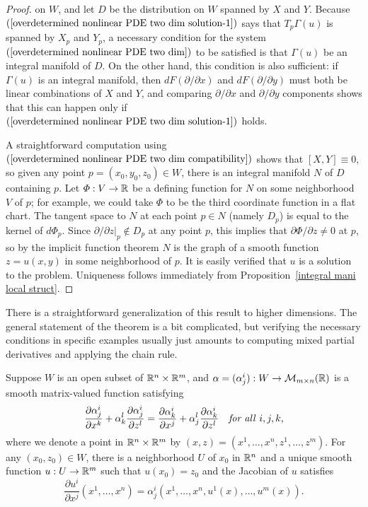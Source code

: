 \begin{proof}
on $W$, and let $D$ be the distribution on $W$ spanned by $X$ and $Y$. Because $(\ref{overdetermined nonlinear PDE two dim solution-1})$ says that $T_p\Gamma(u)$ is spanned by $X_p$ and $Y_p$, a necessary condition for the system $(\ref{overdetermined nonlinear PDE two dim})$ to be satisfied is that $\Gamma(u)$ be an integral manifold of $D$. On the other hand, this condition is also sufficient: if $\Gamma(u)$ is an integral manifold, then $dF(\partial/\partial x)$ and $dF(\partial/\partial y)$ must both be linear combinations of $X$ and $Y$, and comparing $\partial/\partial x$ and $\partial/\partial y$ components shows that this can happen only if $(\ref{overdetermined nonlinear PDE two dim solution-1})$ holds.\par
A straightforward computation using $(\ref{overdetermined nonlinear PDE two dim compatibility})$ shows that $[X,Y]\equiv 0$, so given any point $p=(x_0,y_0,z_0)\in W$, there is an integral manifold $N$ of $D$ containing $p$. Let $\varPhi:V\to\mathbb{R}$ be a defining function for $N$ on some neighborhood $V$ of $p$; for example, we could take $\varPhi$ to be the third coordinate function in a flat chart. The tangent space to $N$ at each point $p\in N$ (namely $D_p$) is equal to the kernel of $d\varPhi_p$. Since $\partial/\partial z|_p\notin D_p$ at any point $p$, this implies that $\partial\varPhi/\partial z\neq 0$ at $p$, so by the implicit function theorem $N$ is the graph of a smooth function $z=u(x,y)$ in some neighborhood of $p$. It is easily verified that $u$ is a solution to the problem. Uniqueness follows immediately from Proposition~\ref{integral mani local struct}.
\end{proof}
There is a straightforward generalization of this result to higher dimensions. The general statement of the theorem is a bit complicated, but verifying the necessary conditions in specific examples usually just amounts to computing mixed partial derivatives and applying the chain rule.
\begin{proposition}
Suppose $W$ is an open subset of $\mathbb{R}^n\times\mathbb{R}^m$, and $\alpha=(\alpha^i_j):W\to\mathcal{M}_{m\times n}(\mathbb{R})$ is a smooth matrix-valued function satisfying
\begin{align*}
\frac{\partial\alpha^i_j}{\partial x^k}+\alpha^l_k\frac{\partial\alpha^i_j}{\partial z^l}=\frac{\partial\alpha^i_k}{\partial x^j}+\alpha^l_j\frac{\partial\alpha^i_k}{\partial z^l}\quad\text{\textit{for all} }i,j,k,
\end{align*}
where we denote a point in $\mathbb{R}^n\times\mathbb{R}^m$ by $(x,z)=(x^1,\dots,x^n,z^1,\dots,z^m)$. For any $(x_0,z_0)\in W$, there is a neighborhood $U$ of $x_0$ in $\mathbb{R}^n$ and a unique smooth function $u:U\to\mathbb{R}^m$ such that $u(x_0)=z_0$ and the Jacobian of $u$ satisfies
\[\frac{\partial u^i}{\partial x^j}(x^1,\dots,x^n)=\alpha^i_j(x^1,\dots,x^n,u^1(x),\dots,u^m(x)).\]
\end{proposition}
